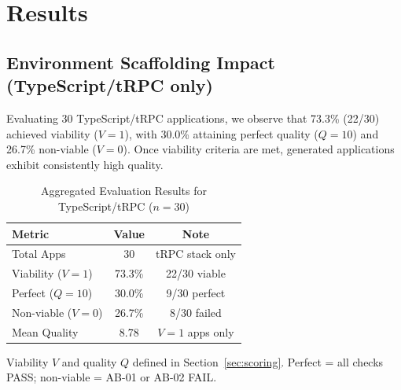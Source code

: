 \documentclass[conference]{IEEEtran}
\begin{document}
\section{Results}
\label{sec:results}

\subsection{Environment Scaffolding Impact (TypeScript/tRPC only)}

Evaluating 30 TypeScript/tRPC applications, we observe that 73.3\% (22/30) achieved viability ($V=1$), with 30.0\% attaining perfect quality ($Q=10$) and 26.7\% non-viable ($V=0$). Once viability criteria are met, generated applications exhibit consistently high quality.

\begin{table}[!t]
\caption{Aggregated Evaluation Results for TypeScript/tRPC ($n=30$)}
\label{tab:aggregated-results}
\centering
\small
\begin{threeparttable}
\begin{tabular}{@{}lcc@{}}
\toprule
\textbf{Metric} & \textbf{Value} & \textbf{Note} \\
\midrule
Total Apps & 30 & tRPC stack only \\
Viability ($V=1$) & 73.3\% & 22/30 viable \\
Perfect ($Q=10$) & 30.0\% & 9/30 perfect \\
Non-viable ($V=0$) & 26.7\% & 8/30 failed \\
Mean Quality & 8.78 & $V=1$ apps only \\
\bottomrule
\end{tabular}
\begin{tablenotes}\footnotesize
\item Viability $V$ and quality $Q$ defined in Section~\ref{sec:scoring}. Perfect = all checks PASS; non-viable = AB-01 or AB-02 FAIL.
\end{tablenotes}
\end{threeparttable}
\end{table}
\end{document}
